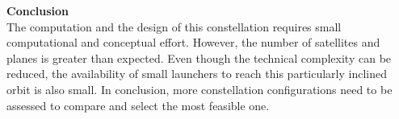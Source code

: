 \textbf{Conclusion}\\
The computation and the design of this constellation requires small computational and conceptual effort. However, the number of satellites and planes is greater than expected. Even though the technical complexity can be reduced, the availability of small launchers to reach this particularly inclined orbit is also small. In conclusion, more constellation configurations need to be assessed to compare and select the most feasible one.

%
%